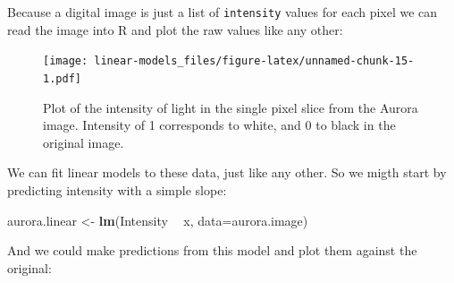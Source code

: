 \documentclass[]{article}
\newenvironment{Shaded}{\begin{snugshade}}{\end{snugshade}}
\newcommand{\DataTypeTok}[1]{\textcolor[rgb]{0.13,0.29,0.53}{#1}}
\newcommand{\DecValTok}[1]{\textcolor[rgb]{0.00,0.00,0.81}{#1}}
\newcommand{\KeywordTok}[1]{\textcolor[rgb]{0.13,0.29,0.53}{\textbf{#1}}}
\newcommand{\NormalTok}[1]{#1}
\newcommand{\OperatorTok}[1]{\textcolor[rgb]{0.81,0.36,0.00}{\textbf{#1}}}
\newcommand{\StringTok}[1]{\textcolor[rgb]{0.31,0.60,0.02}{#1}}
\begin{document}
Because a digital image is just a list of \texttt{intensity} values for each pixel we
can read the image into R and plot the raw values like any other:

\begin{Shaded}
\end{Shaded}

\begin{figure}
\centering
\texttt{[image: linear-models\_files/figure-latex/unnamed-chunk-15-1.pdf]}
\caption{\label{fig:unnamed-chunk-15}Plot of the intensity of light in the single pixel slice from the Aurora image. Intensity of 1 corresponds to white, and 0 to black in the original image.}
\end{figure}

We can fit linear models to these data, just like any other. So we migth start
by predicting intensity with a simple slope:

\begin{Shaded}
\begin{Highlighting}[]
\NormalTok{aurora.linear <-}\StringTok{ }\KeywordTok{lm}\NormalTok{(Intensity }\OperatorTok{~}\StringTok{ }\NormalTok{x, }\DataTypeTok{data=}\NormalTok{aurora.image)}
\end{Highlighting}
\end{Shaded}

And we could make predictions from this model and plot them against the
original:
\end{document}
